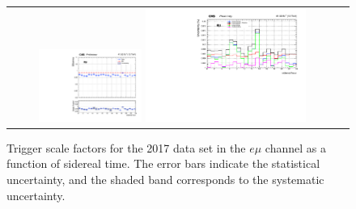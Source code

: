 \begin{figure}[h]
  \begin{center}
    \begin{tabular}{cc}
      \includegraphics[width=0.32\textwidth]{fig_2017_sidereal/g_emu_sidereal_FullSystUncBand.pdf}
      \includegraphics[width=0.50\textwidth]{fig_2017_sidereal/g_emu_sidereal_ErrorsBreakdown.pdf}\\
    \end{tabular}
    \caption{Trigger scale factors for the 2017 data set in the $e\mu$ channel as a function of sidereal time.
            The error bars indicate the statistical uncertainty, and the shaded band corresponds to the systematic uncertainty.
            }
    \label{TrigSF_SideReal_2017_1}
  \end{center}
\end{figure}